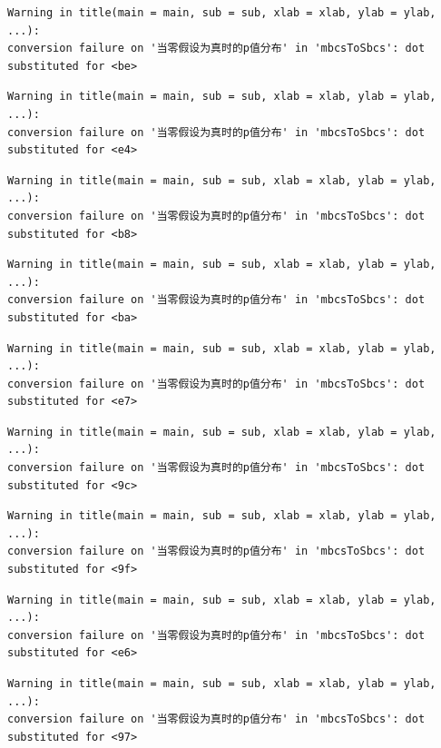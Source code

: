 \documentclass[
  letterpaper,
  DIV=11,
  numbers=noendperiod]{scrreprt}
\begin{document}
\begin{verbatim}
Warning in title(main = main, sub = sub, xlab = xlab, ylab = ylab, ...):
conversion failure on '当零假设为真时的p值分布' in 'mbcsToSbcs': dot
substituted for <be>
\end{verbatim}

\begin{verbatim}
Warning in title(main = main, sub = sub, xlab = xlab, ylab = ylab, ...):
conversion failure on '当零假设为真时的p值分布' in 'mbcsToSbcs': dot
substituted for <e4>
\end{verbatim}

\begin{verbatim}
Warning in title(main = main, sub = sub, xlab = xlab, ylab = ylab, ...):
conversion failure on '当零假设为真时的p值分布' in 'mbcsToSbcs': dot
substituted for <b8>
\end{verbatim}

\begin{verbatim}
Warning in title(main = main, sub = sub, xlab = xlab, ylab = ylab, ...):
conversion failure on '当零假设为真时的p值分布' in 'mbcsToSbcs': dot
substituted for <ba>
\end{verbatim}

\begin{verbatim}
Warning in title(main = main, sub = sub, xlab = xlab, ylab = ylab, ...):
conversion failure on '当零假设为真时的p值分布' in 'mbcsToSbcs': dot
substituted for <e7>
\end{verbatim}

\begin{verbatim}
Warning in title(main = main, sub = sub, xlab = xlab, ylab = ylab, ...):
conversion failure on '当零假设为真时的p值分布' in 'mbcsToSbcs': dot
substituted for <9c>
\end{verbatim}

\begin{verbatim}
Warning in title(main = main, sub = sub, xlab = xlab, ylab = ylab, ...):
conversion failure on '当零假设为真时的p值分布' in 'mbcsToSbcs': dot
substituted for <9f>
\end{verbatim}

\begin{verbatim}
Warning in title(main = main, sub = sub, xlab = xlab, ylab = ylab, ...):
conversion failure on '当零假设为真时的p值分布' in 'mbcsToSbcs': dot
substituted for <e6>
\end{verbatim}

\begin{verbatim}
Warning in title(main = main, sub = sub, xlab = xlab, ylab = ylab, ...):
conversion failure on '当零假设为真时的p值分布' in 'mbcsToSbcs': dot
substituted for <97>
\end{verbatim}
\end{document}
